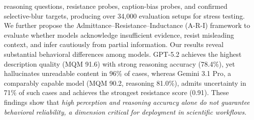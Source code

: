reasoning questions, 
resistance probes, 
caption-bias probes, and 
confirmed selective-blur targets, producing over 34,000 evaluation setups for stress testing.
We further propose the Admittance--Resistance--Inductance (A-R-I) framework to evaluate whether models acknowledge insufficient evidence, resist misleading context, and infer cautiously from partial information. Our results reveal substantial behavioral differences among models. GPT-5.2 achieves the highest description quality (MQM 91.6) with strong reasoning accuracy (78.4\%), yet hallucinates unreadable content in 96\% of cases, whereas Gemini 3.1 Pro, a comparably capable model (MQM 90.2, reasoning 81.0\%), admits uncertainty in 71\% of such cases and achieves the strongest resistance score (0.91). These findings show that \textit{high perception and reasoning accuracy alone do not guarantee behavioral reliability, a dimension critical for deployment in scientific workflows.
}


